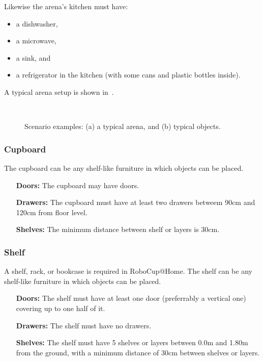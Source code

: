 Likewise the arena's kitchen must have:
\begin{itemize}
	\item a dishwasher,
	\item a microwave,
	\item a sink, and
	\item a refrigerator in the kitchen (with some cans and plastic bottles inside).
\end{itemize}

A typical arena setup is shown in~.

\begin{figure}[tbp]
	\centering
	 ~
	\caption{Scenario examples: (a) a typical arena, and (b) typical objects.}
	\label{fig:arena}
\end{figure}


\subsubsection{Cupboard}
The cupboard can be any shelf-like furniture in which objects can be placed.
\begin{itemize}
	\item[\textbf{Doors:}] The cupboard may have doors.
	\item[\textbf{Drawers:}] The cupboard must have at least two drawers betweem 90cm and 120cm from floor level.
	\item[\textbf{Shelves:}] The minimum distance between shelf or layers is 30cm.
\end{itemize}

\subsubsection{Shelf}
A shelf, rack, or bookcase is required in RoboCup@Home.
The shelf can be any shelf-like furniture in which objects can be placed.
\begin{itemize}
	\item[\textbf{Doors:}] The shelf must have at least one door (preferrably a vertical one) covering up to one half of it.
	\item[\textbf{Drawers:}] The shelf must have no drawers.
	\item[\textbf{Shelves:}] The shelf must have 5 shelves or layers between 0.0m and 1.80m from the ground, with a minimum distance of 30cm between shelves or layers.
\end{itemize}

